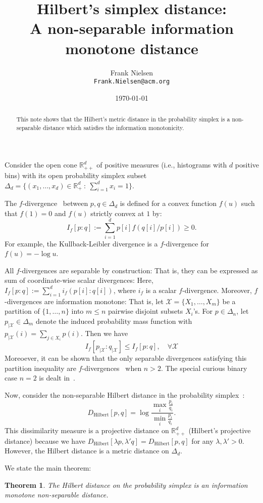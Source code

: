 \documentclass{article}
\title{Hilbert's simplex distance:\\ A non-separable information monotone distance}
\author{Frank Nielsen\\ {\tt Frank.Nielsen@acm.org}}
\date{\today}
\newtheorem{theorem}{Theorem}
\def\bbR{\mathbb{R}}
\def\bbR{\mathbb{R}}
\def\calX{\mathcal{X}}
\def\Hilbert{\mathrm{Hilbert}}
\begin{document}
\maketitle

\begin{abstract}
This note shows that the Hilbert's metric distance in the probability simplex is a non-separable distance which satisfies the information monotonicity. 
\end{abstract}

Consider the open cone $\bbR_{++}^d$ of positive measures (i.e., histograms with $d$ positive bins) with its open probability simplex subset 
$\Delta_d=\{(x_1,\ldots,x_d)\in\bbR_+^d\ :\ \sum_{i=1}^d  x_i=1\}$.

The $f$-divergence~\cite{amari2016information} between $p,q\in\Delta_d$ is defined for a convex function $f(u)$ such that $f(1)=0$ and $f(u)$ strictly convex at $1$ by:
$$
I_f[p:q]:=\sum_{i=1}^d p[i] f(q[i]/p[i])\geq 0.
$$
For example, the Kullback-Leibler divergence is a $f$-divergence for $f(u)=-\log u$.

All $f$-divergences are separable by construction: 
That is, they can be expressed as sum of coordinate-wise scalar divergences: Here, $I_f[p:q]:=\sum_{i=1}^d i_{f}(p[i]:q[i])$, where $i_f$ is a scalar $f$-divergence.
Moreover, $f$-divergences are information monotone: 
That is, let $\calX=\{X_1,\ldots, X_m\}$ be a partition of $\{1,\ldots, n\}$ into $m\leq n$ pairwise disjoint subsets $X_i$'s.
For $p\in\Delta_n$, let $p_{|\calX}\in\Delta_m$ denote the induced probability mass function with $p_{|\calX}(i)=\sum_{j\in X_i} p(i)$.
Then we have
$$
I_f[p_{|\calX}:q_{|\calX}]\leq I_f[p:q], \quad\forall\calX
$$ 
Moreoever, it can be shown that the only separable divergences satisfying this partition inequality are $f$-divergences~\cite{amari2016information} when $n>2$. The special curious binary case $n=2$ is dealt in~\cite{jiao2014information}.

Now, consider the non-separable Hilbert distance in the probability simplex~\cite{nielsen2019clustering}:
$$
D_\Hilbert[p,q]=\log \frac{\max_i \frac{p_i}{q_i}}{\min_i \frac{p_i}{q_i}}. 
$$
This dissimilarity measure is a projective distance on $\bbR^d_{++}$ (Hilbert's projective distance) because 
we have $D_\Hilbert[\lambda p,\lambda' q]=D_\Hilbert[p,q]$ for any $\lambda,\lambda'>0$.
However, the Hilbert distance is a metric distance on $\Delta_d$.

We state the main theorem:

\begin{theorem}
The Hilbert distance on the probability simplex is an information monotone non-separable distance.
\end{theorem}
\end{document}
